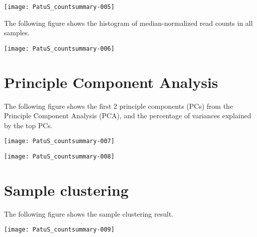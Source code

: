 \documentclass{article}
\begin{document}
\texttt{[image: PatuS\_countsummary-005]}

The following figure shows the histogram of median-normalized read counts in all samples.


\texttt{[image: PatuS\_countsummary-006]}


\newpage\section{Principle Component Analysis}
The following figure shows the first 2 principle components (PCs) from the Principle Component Analysis (PCA), and the percentage of variances explained by the top PCs.



\texttt{[image: PatuS\_countsummary-007]}

\texttt{[image: PatuS\_countsummary-008]}


\newpage\section{Sample clustering}
The following figure shows the sample clustering result.


\texttt{[image: PatuS\_countsummary-009]}

\end{document}
